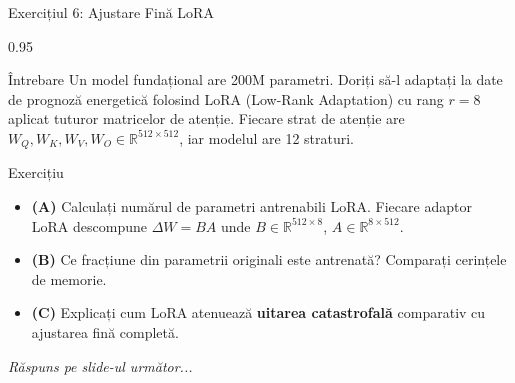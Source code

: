 \documentclass[9pt, aspectratio=169, t]{beamer}
\begin{document}
\begin{frame}{Exercițiul 6: Ajustare Fină LoRA}
    \begin{cminipage}{0.95\textwidth}
    \begin{alertblock}{Întrebare}
        Un model fundațional are 200M parametri. Doriți să-l adaptați la date de prognoză energetică folosind LoRA (Low-Rank Adaptation) cu rang $r = 8$ aplicat tuturor matricelor de atenție. Fiecare strat de atenție are $W_Q, W_K, W_V, W_O \in \mathbb{R}^{512 \times 512}$, iar modelul are 12 straturi.
    \end{alertblock}

    \vspace{0.15cm}

    \begin{block}{Exercițiu}
        \begin{itemize}\setlength{\itemsep}{3pt}
            \item \textcolor{MainBlue}{\textbf{(A)}} Calculați numărul de parametri antrenabili LoRA. Fiecare adaptor LoRA descompune $\Delta W = BA$ unde $B \in \mathbb{R}^{512 \times 8}$, $A \in \mathbb{R}^{8 \times 512}$.
            \item \textcolor{MainBlue}{\textbf{(B)}} Ce fracțiune din parametrii originali este antrenată? Comparați cerințele de memorie.
            \item \textcolor{MainBlue}{\textbf{(C)}} Explicați cum LoRA atenuează \textbf{uitarea catastrofală} comparativ cu ajustarea fină completă.
        \end{itemize}
    \end{block}

    \vspace{0.15cm}

    \begin{center}
        \textit{Răspuns pe slide-ul următor...}
    \end{center}
    \end{cminipage}
\end{frame}
\end{document}
